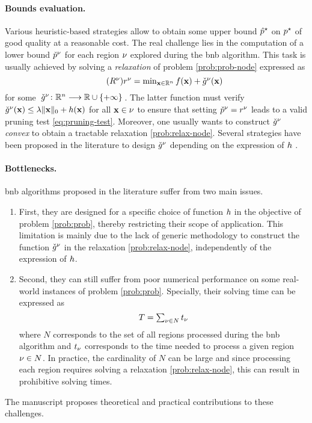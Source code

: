 \documentclass[11pt]{article}
\begin{document}
\paragraph{Bounds evaluation.}
Various heuristic-based strategies allow to obtain some upper bound $\hat{p}^{\star}$ on $p^{\star}$ of good quality at a reasonable cost.
The real challenge lies in the computation of a lower bound $\check{p}^\nu$ for each region $\nu$ explored during the \gls{bnb} algorithm.
This task is usually achieved by solving a \emph{relaxation} of problem \eqref{prob:prob-node} expressed as
\begin{equation}
    \label{prob:relax-node}
    \tag{$\node{\rpb}$}
    \textstyle
    \node{\robj} = \min_{\pv \in \kR^{\pdim}} \lfunc(\pv) + \node{\LB{\rfunc}}(\pv)
\end{equation}
for some $\kfuncdef{\node{\LB{\rfunc}}}{\kR^{\pdim}}{\kR \cup \{+\infty\}}$.
The latter function must verify $\check{g}^\nu(\mathbf{x}) \leq \lambda\|\mathbf{x}\|_0 + h(\mathbf{x})$ for all $\mathbf{x} \in \nu$ to ensure that setting $\check{p}^\nu = r^\nu$ leads to a valid pruning test \eqref{eq:pruning-test}.
Moreover, one usually wants to construct $\check{g}^\nu$ \emph{convex} to obtain a tractable relaxation \eqref{prob:relax-node}.
Several strategies have been proposed in the literature to design $\check{g}^\nu$ depending on the expression of $h$ \citep{ben2022global,hazimeh2022sparse}.

\paragraph{Bottlenecks.}
\gls{bnb} algorithms proposed in the literature suffer from two main issues.
\begin{enumerate}[label=\arabic*., nosep]
    \item First, they are designed for a specific choice of function $h$ in the objective of problem \eqref{prob:prob}, thereby restricting their scope of application. This limitation is mainly due to the lack of generic methodology to construct the function $\check{g}^\nu$ in the relaxation \eqref{prob:relax-node}, independently of the expression of $h$.
    \item Second, they can still suffer from poor numerical performance on some real-world instances of problem \eqref{prob:prob}. Specially, their solving time can be expressed as 
    \begin{equation}
        \label{eq:complexity}
        \textstyle
        T = \sum_{\nu \in N} t_{\nu}
    \end{equation}
    where $N$ corresponds to the set of all regions processed during the \gls{bnb} algorithm and $t_{\nu}$ corresponds to the time needed to process a given region $\nu \in N$. In practice, the cardinality of $N$ can be large and since processing each region requires solving a relaxation \eqref{prob:relax-node}, this can result in prohibitive solving times.
\end{enumerate}
The manuscript proposes theoretical and practical contributions to these challenges.
\end{document}
